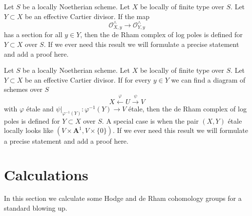 \begin{remark}
\label{remark-check-log-completion-1}
Let $S$ be a locally Noetherian scheme. Let $X$ be locally of finite
type over $S$. Let $Y \subset X$ be an effective Cartier divisor.
If the map
$$
\mathcal{O}_{X, y}^\wedge \longrightarrow \mathcal{O}_{Y, y}^\wedge
$$
has a section for all $y \in Y$, then
the de Rham complex of log poles is defined for $Y \subset X$ over $S$.
If we ever need this result we will formulate a precise statement and
add a proof here.
\end{remark}

\begin{remark}
\label{remark-check-log-completion-2}
Let $S$ be a locally Noetherian scheme. Let $X$ be locally of finite
type over $S$. Let $Y \subset X$ be an effective Cartier divisor.
If for every $y \in Y$ we can find a diagram of schemes over $S$
$$
X \xleftarrow{\varphi} U \xrightarrow{\psi} V
$$
with $\varphi$ \'etale and $\psi|_{\varphi^{-1}(Y)} : \varphi^{-1}(Y) \to V$
\'etale, then the de Rham complex of log poles is defined for
$Y \subset X$ over $S$. A special case is when the pair $(X, Y)$
\'etale locally looks like $(V \times \mathbf{A}^1, V \times \{0\})$.
If we ever need this result we will formulate
a precise statement and add a proof here.
\end{remark}

















\section{Calculations}
\label{section-calculations}

\noindent
In this section we calculate some Hodge and de Rham cohomology
groups for a standard blowing up.

